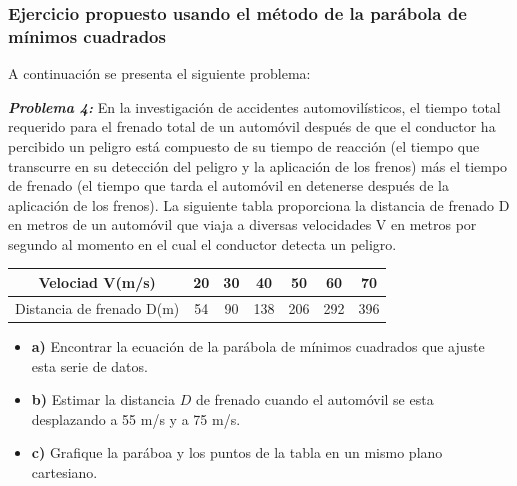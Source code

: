 \documentclass[11pt,letterpaper]{article}
\begin{document}
\subsubsection{Ejercicio propuesto usando el método de la parábola de mínimos cuadrados}
A continuación se presenta el siguiente problema:
\begin{center}
	\textbf{\textit{Problema 4:}} En la investigación de accidentes automovilísticos, el tiempo total requerido para el frenado total de un automóvil después de que el conductor ha percibido un peligro está compuesto de su tiempo de reacción (el tiempo que transcurre en su detección del peligro y la aplicación de los frenos) más el tiempo de frenado (el tiempo que tarda el automóvil en detenerse después de la aplicación de los frenos). La siguiente tabla proporciona la distancia de frenado D en metros de un automóvil que viaja a diversas velocidades V en metros por segundo al momento en el cual el conductor detecta un peligro.
	\linebreak\par
	\begin{tabular}{|c|c|c|c|c|c|c| }
		\hline
		Velociad V(m/s) &   20 & 30 & 40 & 50 & 60 & 70 \\
		\hline
		Distancia de frenado D(m) & 54 & 90 & 138 & 206 & 292 & 396 \\
		\hline
	\end{tabular}
	\begin{itemize}
		\item \textbf{a)} Encontrar la ecuación de la parábola de mínimos cuadrados que ajuste esta serie de datos.
		\item \textbf{b)} Estimar la distancia $D$ de frenado cuando el automóvil se esta desplazando a 55 m/s y a 75 m/s.
		\item \textbf{c)} Grafique la paráboa y los puntos de la tabla en un mismo plano cartesiano.
	\end{itemize}
\end{center}
\end{document}
